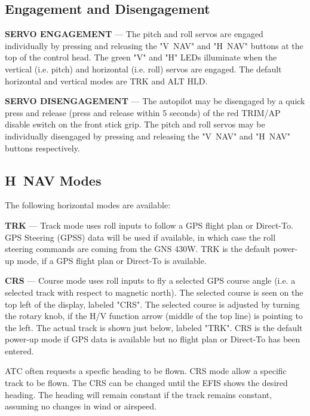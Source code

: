 \subsection*{Engagement and Disengagement}

\textbf{SERVO ENGAGEMENT} --- The pitch and roll servos are engaged individually by pressing and releasing the "V~NAV" and "H~NAV" buttons at the top of the control head. The green "V" and "H" LEDs illuminate when the vertical (i.e. pitch) and horizontal (i.e. roll) servos are engaged. The default horizontal and vertical modes are TRK and ALT HLD.

\textbf{SERVO DISENGAGEMENT} --- The autopilot may be disengaged by a quick press and release (press and release within 5 seconds) of the red TRIM/AP disable switch on the front stick grip. The pitch and roll servos may be individually disengaged by pressing and releasing the "V~NAV" and "H~NAV" buttons respectively. %

\subsection*{H~NAV Modes}
The following horizontal modes are available:

\textbf{TRK} --- Track mode uses roll inputs to follow a GPS flight plan or Direct-To. GPS Steering (GPSS) data will be used if available, in which case the roll steering commands are coming from the GNS 430W. TRK is the default power-up mode, if a GPS flight plan or Direct-To is available.

\textbf{CRS} --- Course mode uses roll inputs to fly a selected GPS course angle (i.e. a selected track with respect to magnetic north). The selected course is seen on the top left of the display, labeled "CRS". The selected course is adjusted by turning the rotary knob, if the H/V function arrow (middle of the top line) is pointing to the left. The actual track is shown just below, labeled "TRK". CRS is the default power-up mode if GPS data is available but no flight plan or Direct-To has been entered.

\begin{Note}
ATC often requests a specfic heading to be flown. CRS mode allow a specific track to be flown. The CRS can be changed until the EFIS shows the desired heading. The heading will remain constant if the track remains constant, assuming no changes in wind or airspeed.
\end{Note}

